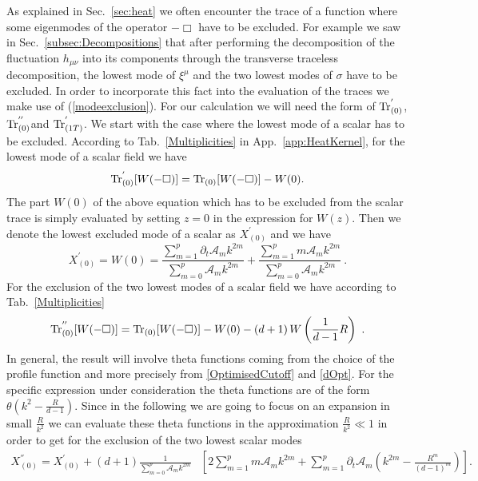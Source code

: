 \documentclass[notitlepage,eqsecnum,bm,amsmath,preprintnumbers,superscriptaddress,nofootinbib,aps,11pt]{revtex4-1}
\def\eq#1{(\ref{#1})}
\begin{document}
As explained in Sec.~\ref{sec:heat} we often encounter the trace of a function where some eigenmodes of the 
operator $-\Box$ 
have to be excluded. For example we saw in  Sec.~\ref{subsec:Decompositions} that after performing the decomposition of 
the fluctuation $h_{\mu\nu}$ into its components through the transverse traceless decomposition, the lowest mode of
$\xi^{\mu}$ and the two lowest modes of $\sigma$ have to be excluded. 
In order to incorporate this fact into the evaluation of the traces we make use of  \eq{modeexclusion}.
For our calculation we will need the form of $\textnormal{Tr}_{(0)}^{'}$, $\textnormal{Tr}_{(0)}^{''}$and
$\textnormal{Tr}_{(1T)}^{'}$. We start with the case where the lowest mode of a scalar has to be excluded. 
According to Tab.~\ref{Multiplicities} in App.~\ref{app:HeatKernel}, for the lowest mode of a scalar field we have
\begin{equation}
\textnormal{Tr}_{(0)}^{'}[W(-\Box)]=\textnormal{Tr}_{(0)}[W(-\Box)]-W(0).
\end{equation}
The part $W(0)$ of the above equation which has to be excluded from the scalar trace is simply evaluated by setting $z=0$ in the 
expression for $W(z)$. Then we denote the lowest excluded mode of a scalar as $X^{'}_{(0)}$ and we have
\begin{equation}
X^{'}_{(0)}=W(0)=\frac{\sum_{m=1}^{p}\partial_t\mathcal{A}_mk^{2m}}{\sum_{m=0}^{p}\mathcal{A}_mk^{2m}}+\frac{\sum_{m=1}^{p}m\mathcal{A}_mk^{2m}}{\sum_{m=0}^{p}\mathcal{A}_mk^{2m}}\ .
\end{equation}
For the exclusion of the two lowest modes of a scalar field we have according to Tab.~\ref{Multiplicities} 
\begin{equation}
\textnormal{Tr}_{(0)}^{''}[W(-\Box)]=\textnormal{Tr}_{(0)}[W(-\Box)]-W(0)-(d+1)\,W\left(\frac{1}{d-1}R\right)\ .
\end{equation}
In general, the result will involve theta functions coming from the choice of the profile function and more precisely from 
\eqref{OptimisedCutoff}
and \eqref{dOpt}. For the specific expression under consideration the theta functions are of 
the form $\theta(k^2-\frac{R}{d-1})$. Since in the following we are going to focus on an expansion in small $\frac{R}{k^2}$ we 
can evaluate these theta functions in the approximation $\frac{R}{k^2}\ll 1$ in order to get for the exclusion of the two lowest 
scalar modes
\begin{equation}
\begin{split}
X^{''}_{(0)}=X^{'}_{(0)}+(d+1)\frac{1}{\sum_{m=0}^{p}\mathcal{A}_mk^{2m}}&\left[2\sum_{m=1}^{p}m\mathcal{A}_mk^{2m}+\sum_{m=1}^{p}\partial_t\mathcal{A}_m\left(k^{2m}-\frac{R^m}{(d-1)^m}\right)\right].
\end{split}
\end{equation}
\end{document}
